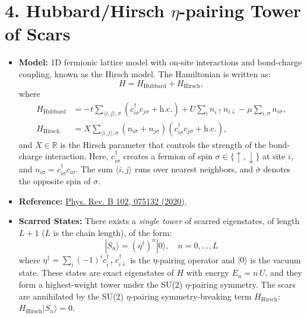 \documentclass[11pt]{article}
\begin{document}
\section*{4. Hubbard/Hirsch $\eta$-pairing Tower of Scars}
\begin{itemize}
  \item \textbf{Model:} 1D fermionic lattice model with on-site interactions and bond-charge coupling, known as the Hirsch model. The Hamiltonian is written as:
    \begin{equation}
    H = H_{\text{Hubbard}} + H_{\text{Hirsch}},
    \end{equation}
    where
    \begin{align}
    H_{\text{Hubbard}} &= - t \sum_{\langle i, j \rangle, \sigma} \left( c^\dagger_{i\sigma} c_{j\sigma} + \text{h.c.} \right) + U \sum_i n_{i\uparrow} n_{i\downarrow} - \mu \sum_{i, \sigma} n_{i\sigma}, \\
    H_{\text{Hirsch}} &= X \sum_{\langle i, j \rangle, \sigma} \left( n_{i\bar{\sigma}} + n_{j\bar{\sigma}} \right) \left( c^\dagger_{i\sigma} c_{j\sigma} + \text{h.c.} \right),
    \end{align}
    and \( X \in \mathbb{R} \) is the Hirsch parameter that controls the strength of the bond-charge interaction. Here, \( c^\dagger_{i\sigma} \) creates a fermion of spin \( \sigma \in \{\uparrow, \downarrow\} \) at site \( i \), and \( n_{i\sigma} = c^\dagger_{i\sigma} c_{i\sigma} \). The sum \( \langle i, j \rangle \) runs over nearest neighbors, and \( \bar{\sigma} \) denotes the opposite spin of \( \sigma \).

    \item \textbf{Reference:} \href{https://journals.aps.org/prb/abstract/10.1103/PhysRevB.102.075132}{Phys. Rev. B 102, 075132 (2020)}.

    \item \textbf{Scarred States:} There exists a \textit{single tower} of scarred eigenstates, of length $L+1$ ($L$ is the chain length), of the form:
    \begin{equation}
    |S_n\rangle = (\eta^\dag)^n |0\rangle, \quad n = 0,\hdots,L
    \end{equation}
    where \( \eta^\dag = \sum_i (-1)^i c^\dagger_{i\uparrow} c^\dagger_{i\downarrow} \) is the \(\eta\)-pairing operator and \( |0\rangle \) is the vacuum state. These states are exact eigenstates of \( H \) with energy \( E_n = n\,U \), and they form a highest-weight tower under the SU(2) \(\eta\)-pairing symmetry. The scars are annihilated by the SU(2) \(\eta\)-pairing symmetry-breaking term $H_{\text{Hirsch}}$: $H_{\text{Hirsch}}|S_n\rangle  = 0$.


\end{itemize}
\end{document}
